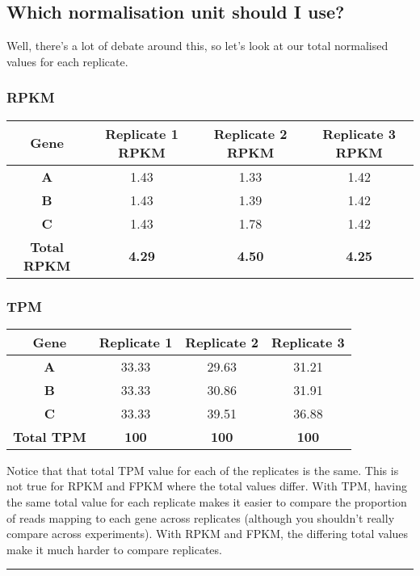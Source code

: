 \documentclass[11pt]{article}
\begin{document}
    \hypertarget{which-normalisation-unit-should-i-use}{%
\subsection{Which normalisation unit should I
use?}\label{which-normalisation-unit-should-i-use}}

Well, there's a lot of debate around this, so let's look at our total
normalised values for each replicate.

\hypertarget{rpkm}{%
\subsubsection{RPKM}\label{rpkm}}

\begin{longtable}[]{@{}cccc@{}}
\hline
Gene & Replicate 1 RPKM & Replicate 2 RPKM & Replicate 3
RPKM\tabularnewline
\hline
\endhead
\textbf{A} & 1.43 & 1.33 & 1.42\tabularnewline
\textbf{B} & 1.43 & 1.39 & 1.42\tabularnewline
\textbf{C} & 1.43 & 1.78 & 1.42\tabularnewline
\textbf{Total RPKM} & \textbf{4.29} & \textbf{4.50} &
\textbf{4.25}\tabularnewline
\hline
\end{longtable}

\hypertarget{tpm}{%
\subsubsection{TPM}\label{tpm}}

\begin{longtable}[]{@{}cccc@{}}
\hline
Gene & Replicate 1 & Replicate 2 & Replicate 3\tabularnewline
\hline
\endhead
\textbf{A} & 33.33 & 29.63 & 31.21\tabularnewline
\textbf{B} & 33.33 & 30.86 & 31.91\tabularnewline
\textbf{C} & 33.33 & 39.51 & 36.88\tabularnewline
\textbf{Total TPM} & \textbf{100} & \textbf{100} &
\textbf{100}\tabularnewline
\hline
\end{longtable}

Notice that that total TPM value for each of the replicates is the same.
This is not true for RPKM and FPKM where the total values differ. With
TPM, having the same total value for each replicate makes it easier to
compare the proportion of reads mapping to each gene across replicates
(although you shouldn't really compare across experiments). With RPKM
and FPKM, the differing total values make it much harder to compare
replicates.

    \begin{center}\rule{0.5\linewidth}{.4pt}\end{center}
\end{document}
